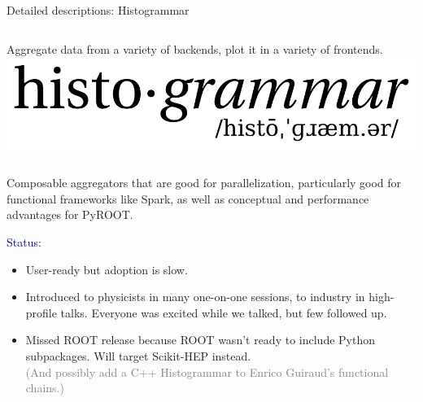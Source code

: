 \documentclass{beamer}
\begin{document}
\begin{frame}{Detailed descriptions: Histogrammar}
\vspace{0.6 cm}
\begin{columns}
Aggregate data from a variety of backends, plot it in a variety of frontends.
\includegraphics[width=\linewidth]{histogrammar-logo.png}
\end{columns}

\vspace{0.4 cm}
Composable aggregators that are good for parallelization, particularly good for functional frameworks like Spark, as well as conceptual and performance advantages for PyROOT.

\vspace{0.4 cm}
\textcolor{darkblue}{Status:}
\begin{itemize}
\item User-ready but adoption is slow.
\item Introduced to physicists in many one-on-one sessions, to industry in high-profile talks. Everyone was excited while we talked, but few followed up.
\item Missed ROOT release because ROOT wasn't ready to include Python subpackages. Will target Scikit-HEP instead. \\ \textcolor{gray}{(And possibly add a C++ Histogrammar to Enrico Guiraud's functional chains.)}
\end{itemize}
\end{frame}
\end{document}
